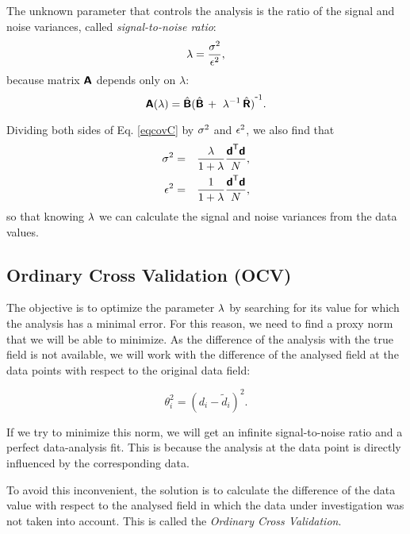 The unknown parameter that controls the analysis is the ratio of the signal and noise variances, called \textit{signal-to-noise ratio}:
\begin{equation}
\lambda=\frac{\sigma^2}{\epsilon^2},
\end{equation}
because matrix $\mbox{\boldmath $ \protect\mathsf{A} $}$ depends only on $\lambda$:
\begin{equation}
\mbox{\boldmath $ \protect\mathsf{A} $}(\lambda)=\hat{\mbox{\boldmath $ \protect\mathsf{B} $}} {(\hat{\mbox{\boldmath $ \protect\mathsf{B} $}}\, + \,\, \lambda^{-1} \, \hat{\mbox{\boldmath $ \protect\mathsf{R} $}})}^{ \mbox{\small{-}} 1}.
\end{equation}


Dividing both sides of Eq. \ref{eqcovC} by $\sigma^{2}$ and  $\epsilon^{2}$, we also find that
\begin{eqnarray}
\sigma^2 &=& \frac{\lambda}{1 + \lambda} \frac{ {\mbox{\boldmath $ \protect\mathsf{d} $}}^\mathsf{T} \mbox{\boldmath $ \protect\mathsf{d} $}}{N},\label{eq:signalsnr}\\
\epsilon^2 &=& \frac{1 }{ 1 + \lambda} \frac{ {\mbox{\boldmath $ \protect\mathsf{d} $}}^\mathsf{T} \mbox{\boldmath $ \protect\mathsf{d} $} }{ N},\label{eq:noisesnr}
\end{eqnarray}
so that knowing $\lambda$ we can calculate the signal and noise variances from the data values.

\subsection{Ordinary Cross Validation (OCV)}

The objective is to optimize the parameter $\lambda$ by searching for its value for which the analysis has a minimal error. For this reason, we need to find a proxy norm that we will be able to minimize. As the difference of the analysis with the true field is not available, we will work with the difference of the analysed field at the data points with respect to the original data field:

\begin{equation}
{\theta_i^2} = {(d_i - \tilde{d}_i)^2}.
\end{equation}

If we try to minimize this norm, we will get an infinite signal-to-noise ratio and a perfect data-analysis fit. This is because the analysis at the data point is directly influenced by the corresponding data. 

To avoid this inconvenient, the solution is to calculate the difference of the data value with respect to the analysed field in which the data under investigation was not taken into account. This is called the \textit{Ordinary Cross Validation}. 

